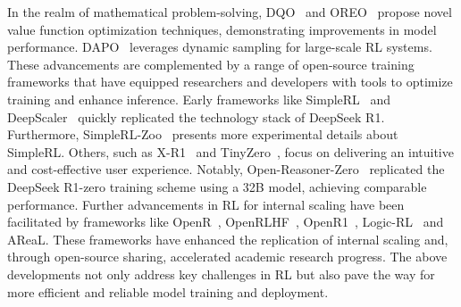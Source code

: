 In the realm of mathematical problem-solving, DQO~\citep{ji2024enhancing} and OREO~\citep{wang2024offline} propose novel value function optimization techniques, demonstrating improvements in model performance. 
DAPO~\citep{yu2025dapo} leverages dynamic sampling for large-scale RL systems. 
These advancements are complemented by a range of open-source training frameworks that have equipped researchers and developers with tools to optimize training and enhance inference. Early frameworks like SimpleRL~\citep{zeng2025simplerl} and DeepScaler~\citep{deepscaler2025} quickly replicated the technology stack of DeepSeek R1. Furthermore, SimpleRL-Zoo~\citep{zeng2025simplerlzoo} presents more experimental details about SimpleRL.  Others, such as X-R1~\citep{xr12025} and TinyZero~\citep{tinyzero}, focus on delivering an intuitive and cost-effective user experience. Notably, Open-Reasoner-Zero~\citep{OpenReasonerZero2025} replicated the DeepSeek R1-zero training scheme using a 32B model, achieving comparable performance.
Further advancements in RL for internal scaling have been facilitated by frameworks like OpenR~\citep{wang2024openr}, OpenRLHF~\citep{hu2024openrlhf}, OpenR1~\citep{openr1}, Logic-RL~\citep{xie2025logic} and AReaL\citep{areal2025}. These frameworks have enhanced the replication of internal scaling and, through open-source sharing, accelerated academic research progress. 
The above developments not only address key challenges in RL but also pave the way for more efficient and reliable model training and deployment.



